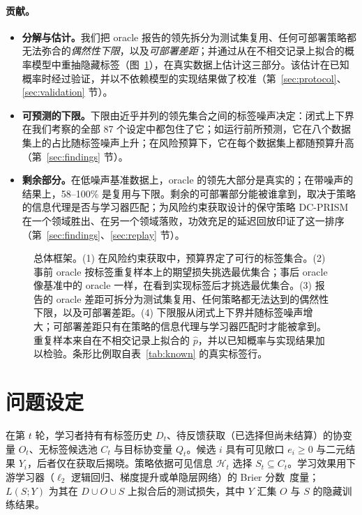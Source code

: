 \documentclass[runningheads]{llncs}
\begin{document}
\paragraph{贡献。}
\begin{itemize}
\item \textbf{分解与估计。}我们把 oracle 报告的领先拆分为测试集复用、任何可部署策略都无法弥合的\emph{偶然性下限}，以及\emph{可部署差距}；并通过从在不相交记录上拟合的概率模型中重抽隐藏标签（图~\ref{fig:framework}），在真实数据上估计这三部分。该估计在已知概率时经过验证，并以不依赖模型的实现结果做了校准（第~\ref{sec:protocol}、\ref{sec:validation} 节）。
\item \textbf{可预测的下限。}下限由近乎并列的领先集合之间的标签噪声决定：闭式上下界在我们考察的全部 87 个设定中都包住了它；如运行前所预测，它在八个数据集上的占比随标签噪声上升；在风险预算下，它在每个数据集上都随预算升高（第~\ref{sec:findings} 节）。
\item \textbf{剩余部分。}在低噪声基准数据上，oracle 的领先大部分是真实的；在带噪声的结果上，58--100\% 是复用与下限。剩余的可部署部分能被谁拿到，取决于策略的信息代理是否与学习器匹配；为风险约束获取设计的保守策略 DC-PRISM 在一个领域胜出、在另一个领域落败，功效充足的延迟回放印证了这一排序（第~\ref{sec:findings}、\ref{sec:replay} 节）。
\end{itemize}

\begin{figure}[t]
 \centering
 \resizebox{\linewidth}{!}{}
 \caption{总体框架。(1) 在风险约束获取中，预算界定了可行的标签集合。(2) 事前 oracle 按标签重复样本上的期望损失挑选最优集合；事后 oracle 像基准中的 oracle 一样，在看到实现标签后才挑选最优集合。(3) 报告的 oracle 差距可拆分为测试集复用、任何策略都无法达到的偶然性下限，以及可部署差距。(4) 下限服从闭式上下界并随标签噪声增大；可部署差距只有在策略的信息代理与学习器匹配时才能被拿到。重复样本来自在不相交记录上拟合的 $\hat p$，并以已知概率与实现结果加以检验。条形比例取自表~\ref{tab:known} 的真实标签行。}
 \label{fig:framework}
\end{figure}

\section{问题设定}
\label{sec:setting}
在第 $t$ 轮，学习者持有有标签历史 $D_t$、待反馈获取（已选择但尚未结算）的协变量 $O_t$、无标签候选池 $C_t$ 与目标协变量 $Q_t$。候选 $i$ 具有可见敞口 $e_i\ge0$ 与二元结果 $Y_i$，后者仅在获取后揭晓。策略依据可见信息 $\mathcal H_t$ 选择 $S_t\subseteq C_t$。学习效果用下游学习器（$\ell_2$ 逻辑回归、梯度提升或单隐层网络）的 Brier 分数~\cite{brier1950verification}度量；$L(S;Y)$ 为其在 $D\cup O\cup S$ 上拟合后的测试损失，其中 $Y$ 汇集 $O$ 与 $S$ 的隐藏训练结果。
\end{document}
